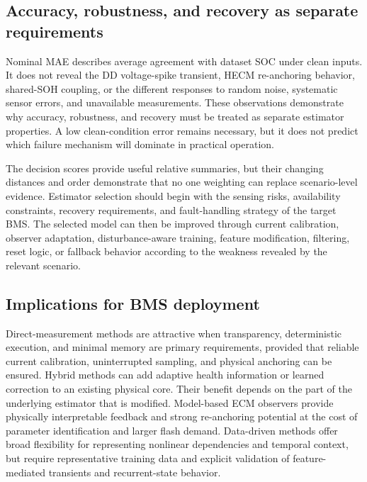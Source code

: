 \subsection{Accuracy, robustness, and recovery as separate requirements}

Nominal MAE describes average agreement with dataset SOC under clean inputs. It does not reveal the DD voltage-spike transient, HECM re-anchoring behavior, shared-SOH coupling, or the different responses to random noise, systematic sensor errors, and unavailable measurements. These observations demonstrate why accuracy, robustness, and recovery must be treated as separate estimator properties. A low clean-condition error remains necessary, but it does not predict which failure mechanism will dominate in practical operation.

The decision scores provide useful relative summaries, but their changing distances and order demonstrate that no one weighting can replace scenario-level evidence. Estimator selection should begin with the sensing risks, availability constraints, recovery requirements, and fault-handling strategy of the target BMS. The selected model can then be improved through current calibration, observer adaptation, disturbance-aware training, feature modification, filtering, reset logic, or fallback behavior according to the weakness revealed by the relevant scenario.

\subsection{Implications for BMS deployment}
\label{sec:robustness_decision_interpretation}

Direct-measurement methods are attractive when transparency, deterministic execution, and minimal memory are primary requirements, provided that reliable current calibration, uninterrupted sampling, and physical anchoring can be ensured. Hybrid methods can add adaptive health information or learned correction to an existing physical core. Their benefit depends on the part of the underlying estimator that is modified. Model-based ECM observers provide physically interpretable feedback and strong re-anchoring potential at the cost of parameter identification and larger flash demand. Data-driven methods offer broad flexibility for representing nonlinear dependencies and temporal context, but require representative training data and explicit validation of feature-mediated transients and recurrent-state behavior.

